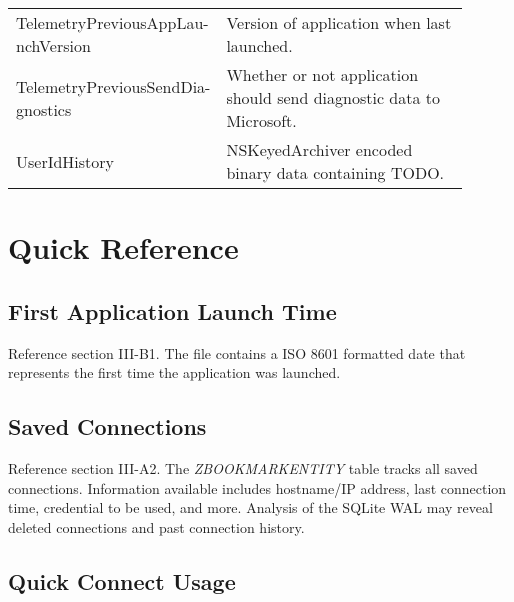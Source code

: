 \documentclass[journal]{IEEEtran}
\begin{document}
\begin{table}[h!]
\begin{tabular}{p{0.35\linewidth} | p{0.55\linewidth}}
TelemetryPreviousAppLau- nchVersion                & Version of application when last launched.                                                                                                                                                                                                                                                        
\\
TelemetryPreviousSendDia- gnostics                 & Whether or not application should send diagnostic data to Microsoft.                                                                                                                                                                                                                              \\
UserIdHistory                                      & NSKeyedArchiver encoded binary data containing TODO.                                                                                                                                                                                                                                              
\end{tabular}
\end{table}

\section{Quick Reference}

\subsection{First Application Launch Time}

Reference section III-B1. The file  contains a ISO 8601 formatted date that represents the first time the application was launched.

\subsection{Saved Connections}

Reference section III-A2. The \textit{ZBOOKMARKENTITY} table tracks all saved connections. Information available includes hostname/IP address, last connection time, credential to be used, and more. Analysis of the SQLite WAL may reveal deleted connections and past connection history.

\subsection{Quick Connect Usage}
\end{document}
